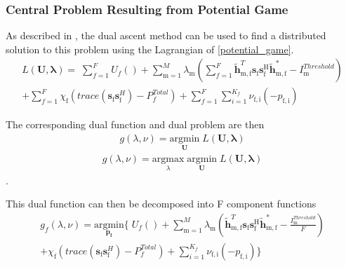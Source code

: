 \documentclass[12pt,a4paper]{report}
\begin{document}
\subsubsection{Central Problem Resulting from Potential Game}
As described in \cite[p.~8,9]{boyd2011distributed}, the dual ascent method can be used to find a distributed solution to this problem using the Lagrangian of \eqref{potential_game}. 
\\
\begin{multline}
L(\mathbf{U,\lambda}) = 
\;
\sum_{f=1}^F U_f() 
+
\sum_{\mathrm{m=1}}^M \lambda_{\mathrm{m}}
(	  \sum^F_{f=1} \mathbf{\tilde{h}}_{\mathrm{m,f}}^T  \mathbf{s}_{\mathrm{f}} 						
	\mathbf{s_{\mathrm{f}}^{\mathrm{H}}} \mathbf{\tilde{h}_{\mathrm{m,f}}^*} - I^{Threshold}		
	_{\mathrm{m}} )
\\
+ 
\sum_{f=1}^F
\chi_{\mathrm{f}}(trace(\mathbf{s}_\mathrm{f}\mathbf{s}_\mathrm{f}^H)-P^{Total}_{f} )
+
\sum_{f=1}^F 
\sum_{i=1}^{K_f}
\nu_{\mathrm{f,i}}(-p_{\mathrm{f,i}})
\end{multline}

The corresponding dual function and dual problem are then 
\begin{gather*}
g(\lambda,\nu) = \underset{\mathbf{U}}{\mathrm{argmin}}\;L(\mathbf{U,\lambda})
\end{gather*}
\begin{gather*}
g(\lambda,\nu) = \underset{\lambda}{\mathrm{argmax}}\;\underset{\mathbf{U}}{\mathrm{argmin}}\;L(\mathbf{U,\lambda})
\end{gather*}
.



This dual function can then be decomposed into F component functions
\begin{multline}
g_f(\lambda,\nu) = \underset{\mathbf{p_f}}{\mathrm{argmin}}
\{
\;
U_f() 
+
\sum_{\mathrm{m=1}}^M \lambda_{\mathrm{m}}
(\mathbf{\tilde{h}}_{\mathrm{m,f}}^T  \mathbf{s}_{\mathrm{f}} 						
	\mathbf{s_{\mathrm{f}}^{\mathrm{H}}} \mathbf{\tilde{h}_{\mathrm{m,f}}^*} - \frac{I^{Threshold}_{\mathrm{m}}}{F})
\\
+ 
\chi_{\mathrm{f}}(trace(\mathbf{s}_\mathrm{f}\mathbf{s}_\mathrm{f}^H)-P^{Total}_{f} )
+
\sum_{i=1}^{K_f}
\nu_{\mathrm{f,i}}(-p_{\mathrm{f,i}})\}
\end{multline}
\\
\end{document}
